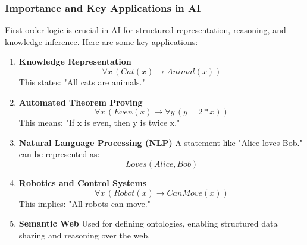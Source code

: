 \documentclass[aspectratio=169]{beamer}
\begin{document}
\begin{frame}[fragile]
    \frametitle{Importance and Key Applications in AI}
    First-order logic is crucial in AI for structured representation, reasoning, and knowledge inference. Here are some key applications:
    
    \begin{enumerate}
        \item \textbf{Knowledge Representation}
            \begin{equation}
            \forall x \, (Cat(x) \rightarrow Animal(x)) 
            \end{equation}
            This states: "All cats are animals."
        
        \item \textbf{Automated Theorem Proving}
            \begin{equation}
            \forall x \, (Even(x) \rightarrow \forall y \, (y = 2 * x)) 
            \end{equation}
            This means: "If x is even, then y is twice x."
        
        \item \textbf{Natural Language Processing (NLP)}
            A statement like "Alice loves Bob." can be represented as:
            \begin{equation}
            Loves(Alice, Bob)
            \end{equation}
        
        \item \textbf{Robotics and Control Systems}
            \begin{equation}
            \forall x \, (Robot(x) \rightarrow CanMove(x)) 
            \end{equation}
            This implies: "All robots can move."
        
        \item \textbf{Semantic Web}
            Used for defining ontologies, enabling structured data sharing and reasoning over the web.
    \end{enumerate}
\end{frame}
\end{document}

